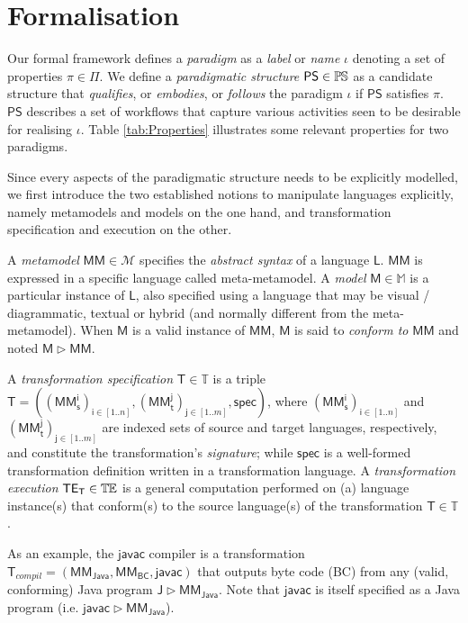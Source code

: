\section{Formalisation}
\label{sec:Formalisation}

Our formal framework defines a \emph{paradigm} as a \emph{label} or \emph{name}
$\iota$ denoting a set of properties $\pi\in\Pi$.
We define a \emph{paradigmatic structure} $\mathsf{PS}\in \mathbb{P}\mskip-1mu\mathbb{S}$ as a candidate
structure that \emph{qualifies}, or \emph{embodies}, or \emph{follows} the
paradigm $\iota$ if $\mathsf{PS}$ satisfies $\pi$.
$\mathsf{PS}$ describes a set of workflows that capture various activities seen
to be desirable for realising $\iota$. Table \ref{tab:Properties} illustrates
some relevant properties for two paradigms.

Since every aspects of the paradigmatic structure needs to be explicitly
modelled, we first introduce the two established notions to manipulate languages
explicitly, namely metamodels and models on the one hand, and transformation
specification and execution on the other.

A \emph{metamodel} $\mathsf{MM} \in \mathcal{M}$ specifies the \emph{abstract 
syntax} of a language $\mathsf{L}$. $\mathsf{MM}$ is expressed in a specific 
language called meta-metamodel. 
A \emph{model} $\mathsf{M} \in \mathbb{M}$ is a particular instance of 
$\mathsf{L}$, also specified using a language that may be visual / 
diagrammatic, textual or hybrid (and normally different from the 
meta-metamodel). When $\mathsf{M}$ is a valid instance of 
$\mathsf{MM}$, $\mathsf{M}$ is said to \emph{conform to} $\mathsf{MM}$ and noted 
$\mathsf{M} \rhd \mathsf{MM}$. 

A \emph{transformation specification} $\mathsf{T}\in\mathbb{T}$ is a triple 
$\mathsf{T} = ((\mathsf{MM_s^{i}})_{\mathsf{i}\in [1..n]}, 
(\mathsf{MM_t^{j}})_{\mathsf{j}\in[1..m]}, \mathsf{spec})$, where  
$(\mathsf{MM_s^{i}})_{\mathsf{i}\in [1..n]}$ and
$(\mathsf{MM_t^{j}})_{\mathsf{j}\in [1..m]}$ are indexed sets of source and
target languages, respectively, and constitute the transformation's 
\emph{signature}; while $\mathsf{spec}$ is a well-formed 
transformation definition written in a transformation language. A 
\emph{transformation execution} $\mathsf{TE_{T}}\in\mathbb{T}\mskip-1mu\mathbb{E}$ is a general 
computation performed on (a) language instance(s) that conform(s) to the 
source language(s) of the transformation $\mathsf{T}\in\mathbb{T}$.

As an example, the $\mathsf{javac}$ compiler is a transformation
$\mathsf{T}_{compil} = (\mathsf{MM_{Java}}, \mathsf{MM_{BC}}, \mathsf{javac})$
that outputs byte code (BC) from any (valid, conforming) Java program
$\mathsf{J}  \rhd \mathsf{MM_{Java}}$.
Note that $\mathsf{javac}$ is itself specified as a Java program (i.e.
$\mathsf{javac} \rhd \mathsf{MM_{Java}}$).


